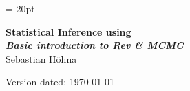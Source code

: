 \documentclass[11pt]{article}
\begin{document}
\renewcommand{\headrulewidth}{0.5pt}
\headsep = 20pt
\lhead{ }

\thispagestyle{plain}
\begin{center}

\textbf{\LARGE Statistical Inference using \RevBayes}\\\vspace{2mm}
\textbf{\it{\Large Basic introduction to Rev \& MCMC}}\\\vspace{2mm}
\vspace{1cm}
{\Large Sebastian H{\"o}hna}
\vspace{1cm}
\end{center}

\def \ResourcePath {./}
\def \GlobalResourcePath {../}


Version dated: \today
\end{document}
